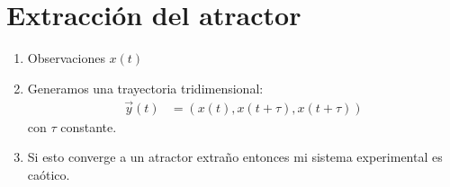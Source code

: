  \section{Extracción del atractor}
 \begin{enumerate}
 	\item Observaciones $x(t)$ 
	\item Generamos una trayectoria tridimensional:
		\begin{align*}
		  \vec{y}(t) &= \left( x(t), x(t+\tau), x(t+\tau) \right)
		\end{align*}
		con $ \tau$ constante.
	\item Si esto converge a un atractor extraño entonces mi sistema experimental es caótico. 
 \end{enumerate}



